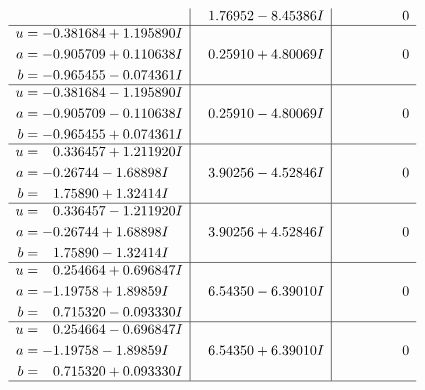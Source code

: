 \documentclass[1p]{elsarticle_modified}
\theoremstyle{definition}
\begin{document}
$$\begin{array}{c|c|c}
 & \phantom{-}1.76952 - 8.45386 I & \phantom{-0.000000 } 0 \\ \hline\begin{aligned}
u &= -0.381684 + 1.195890 I \\
a &= -0.905709 + 0.110638 I \\
b &= -0.965455 - 0.074361 I\end{aligned}
 & \phantom{-}0.25910 + 4.80069 I & \phantom{-0.000000 } 0 \\ \hline\begin{aligned}
u &= -0.381684 - 1.195890 I \\
a &= -0.905709 - 0.110638 I \\
b &= -0.965455 + 0.074361 I\end{aligned}
 & \phantom{-}0.25910 - 4.80069 I & \phantom{-0.000000 } 0 \\ \hline\begin{aligned}
u &= \phantom{-}0.336457 + 1.211920 I \\
a &= -0.26744 - 1.68898 I \\
b &= \phantom{-}1.75890 + 1.32414 I\end{aligned}
 & \phantom{-}3.90256 - 4.52846 I & \phantom{-0.000000 } 0 \\ \hline\begin{aligned}
u &= \phantom{-}0.336457 - 1.211920 I \\
a &= -0.26744 + 1.68898 I \\
b &= \phantom{-}1.75890 - 1.32414 I\end{aligned}
 & \phantom{-}3.90256 + 4.52846 I & \phantom{-0.000000 } 0 \\ \hline\begin{aligned}
u &= \phantom{-}0.254664 + 0.696847 I \\
a &= -1.19758 + 1.89859 I \\
b &= \phantom{-}0.715320 - 0.093330 I\end{aligned}
 & \phantom{-}6.54350 - 6.39010 I & \phantom{-0.000000 } 0 \\ \hline\begin{aligned}
u &= \phantom{-}0.254664 - 0.696847 I \\
a &= -1.19758 - 1.89859 I \\
b &= \phantom{-}0.715320 + 0.093330 I\end{aligned}
 & \phantom{-}6.54350 + 6.39010 I & \phantom{-0.000000 } 0\\
 \hline 
 \end{array}$$\newpage$$\begin{array}{c|c|c}  

\end{array}$$
\end{document}
